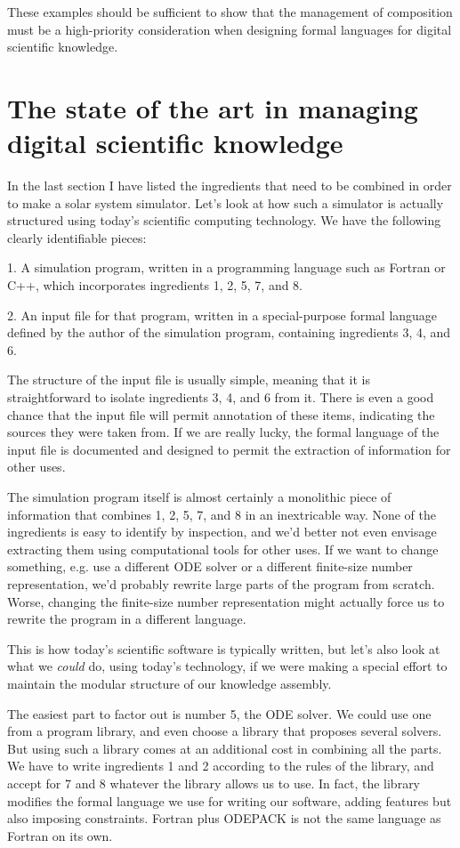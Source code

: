 These examples should be sufficient to show that the management of composition must be a high-priority consideration when designing formal languages for digital scientific knowledge.

\section{The state of the art in managing digital scientific knowledge}
\label{state-of-the-art}

In the last section I have listed the ingredients that need to be combined in order to make a solar system simulator. Let's look at how such a simulator is actually structured using today's scientific computing technology. We have the following clearly identifiable pieces:

  1. A simulation program, written in a programming language such as Fortran or C++, which incorporates ingredients 1, 2, 5, 7, and 8.

  2. An input file for that program, written in a special-purpose formal language defined by the author of the simulation program, containing ingredients 3, 4, and 6.

The structure of the input file is usually simple, meaning that it is straightforward to isolate ingredients 3, 4, and 6 from it. There is even a good chance that the input file will permit annotation of these items, indicating the sources they were taken from. If we are really lucky, the formal language of the input file is documented and designed to permit the extraction of information for other uses.

The simulation program itself is almost certainly a monolithic piece of information that combines 1, 2, 5, 7, and 8 in an inextricable way. None of the ingredients is easy to identify by inspection, and we'd better not even envisage extracting them using computational tools for other uses. If we want to change something, e.g. use a different ODE solver or a different finite-size number representation, we'd probably rewrite large parts of the program from scratch. Worse, changing the finite-size number representation might actually force us to rewrite the program in a different language.

This is how today's scientific software is typically written, but let's also look at what we \textit{could} do, using today's technology, if we were making a special effort to maintain the modular structure of our knowledge assembly.

The easiest part to factor out is number 5, the ODE solver. We could use one from a program library, and even choose a library that proposes several solvers. But using such a library comes at an additional cost in combining all the parts. We have to write ingredients 1 and 2 according to the rules of the library, and accept for 7 and 8 whatever the library allows us to use. In fact, the library modifies the formal language we use for writing our software, adding features but also imposing constraints. Fortran plus ODEPACK is not the same language as Fortran on its own.

